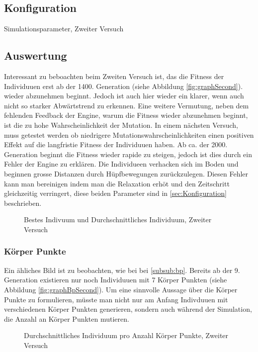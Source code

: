       \subsection{Konfiguration}
        \begin{table}[H]
          
          \caption{Simulationsparameter, Zweiter Versuch}
        \end{table}
      \subsection{Auswertung}
        Interessant zu beboachten beim Zweiten Versuch ist, das die Fitness der Individuuen erst ab der 1400. Generation (siehe Abbildung \ref{fig:graphSecond}).
        wieder abzunehmen beginnt. Jedoch ist auch hier wieder ein klarer, wenn auch nicht so starker Abwärtstrend zu erkennen.
        Eine weitere Vermutung, neben dem fehlenden Feedback der Engine, warum die Fitness wieder abzunehmen beginnt,
        ist die zu hohe Wahrscheinlichkeit der Mutation. In einem nächsten Versuch, muss getestet werden ob niedrigere Mutationswahrscheinlichkeiten
        einen positiven Effekt auf die langfristie Fitness der Individuuen haben. Ab ca. der 2000. Generation beginnt die Fitness wieder rapide zu steigen,
        jedoch ist dies durch ein Fehler der Engine zu erklären. Die Individueen verhacken sich im Boden und beginnen grosse Distanzen durch Hüpfbewegungen zurückzulegen.
        Diesen Fehler kann man bereinigen indem man die Relaxation erhöt und den Zeitschritt gleichzeitig verringert, diese beiden Parameter sind in \ref{sec:Konfiguration} beschrieben.
          \begin{figure}
            
            \caption{Bestes Indivuum und Durchschnittliches Individuum, Zweiter Versuch}
            \label{fig:graphThird}
          \end{figure}

      \subsubsection{Körper Punkte}
        Ein ähliches Bild ist zu beobachten, wie bei bei \ref{subsub:bp}.
        Bereits ab der 9. Generation existieren nur noch Individuuen mit 7 Körper Punkten (siehe Abbildung \ref{fig:graphBpSecond}).
        Um eine sinnvolle Aussage über die Körper Punkte zu formulieren, müsste man nicht nur am Anfang Indivduuen mit verschiedenen Körper Punkten generieren,
        sondern auch während der Simulation, die Anzahl an Körper Punkten mutieren.
      \begin{figure}
        
        \caption{Durchschnittliches Individuum pro Anzahl Körper Punkte, Zweiter Versuch}
        \label{fig:graphBpThird}
      \end{figure}
